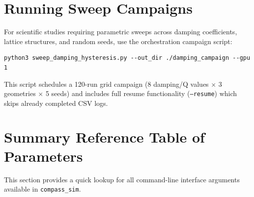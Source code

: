 \documentclass[11pt,a4paper]{article}
\newcommand{\code}[1]{\texttt{#1}}
\begin{document}
\section{Running Sweep Campaigns}
\label{sec:sweeps}

For scientific studies requiring parametric sweeps across damping coefficients, lattice structures, and random seeds, use the orchestration campaign script:

\begin{lstlisting}
python3 sweep_damping_hysteresis.py --out_dir ./damping_campaign --gpu 1
\end{lstlisting}

\noindent
This script schedules a 120-run grid campaign (8 damping/Q values $\times$ 3 geometries $\times$ 5 seeds) and includes full resume functionality (\code{--resume}) which skips already completed CSV logs.

\newpage
\section{Summary Reference Table of Parameters}
\label{sec:summary_table}

This section provides a quick lookup for all command-line interface arguments available in \code{compass\_sim}.
\end{document}
